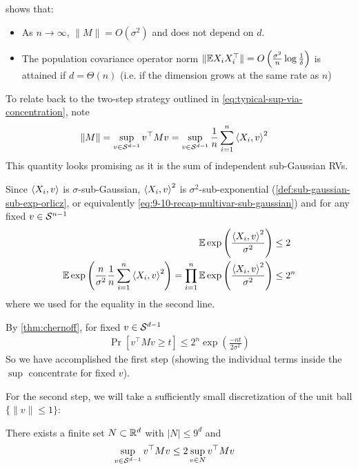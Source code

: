 \begin{remark}
     shows that:
    \begin{itemize}
        \item As $n \to \infty$, $\|M\| = O(\sigma^2)$ and does not depend on $d$.
        \item The population covariance operator norm $\|\mathbb{E} X_i X_i^\top\| = O\left( \frac{\sigma^2}{n} \log \frac{1}{\delta} \right)$ is attained if $d = \Theta(n)$ (i.e. if the dimension grows at the same rate as $n$)
    \end{itemize}
\end{remark}


To relate back to the two-step strategy outlined in \cref{eq:typical-sup-via-concentration}, note
\begin{align}
    \|M\| &= \sup_{v \in \mathcal{S}^{d-1}} v^\top M v
    = \sup_{v \in \mathcal{S}^{d-1}} \frac{1}{n} \sum_{i=1}^n \braket{X_i, v}^2
\end{align}
This quantity looks promising as it is the sum of independent sub-Gaussian RVs.

Since $\braket{X_i, v}$ is $\sigma$-sub-Gaussian, $\braket{X_i, v}^2$ is $\sigma^2$-sub-exponential (\cref{def:sub-gaussian-sub-exp-orlicz}, or equivalently \cref{eq:9-10-recap-multivar-sub-gaussian})
and for any fixed $v \in \mathcal{S}^{n-1}$ 
\begin{align}
    \mathbb{E} \exp\left(\frac{\braket{X_i, v}^2}{\sigma^2}\right) &\leq 2 \\
    \mathbb{E} \exp\left(\frac{n}{\sigma^2} \frac{1}{n} \sum_{i=1}^n \braket{X_i, v}^2 \right)
    = \prod_{i=1}^n \mathbb{E} \exp \left(\frac{\braket{X_i, v}^2}{\sigma^2}\right) 
    &\leq 2^n 
\end{align}
where we used  for the equality in the second line.

By \cref{thm:chernoff}, for fixed $v \in \mathcal{S}^{d-1}$
\begin{align}
    \Pr[v^\top M v \geq t] \leq 2^n \exp\left(\frac{-n t}{2 \sigma^2}\right) \label{eq:9-10-conc-sum}
\end{align}
So we have accomplished the first step (showing the individual terms inside the $\sup$ concentrate for fixed $v$).

For the second step, we will take a sufficiently small discretization of the unit ball $\{\|v\|\leq 1\}$:
\begin{lemma}\label{lem:9-10-unit-ball-packing}
    There exists a finite set $N \subset \mathbb{R}^d$ with $\lvert N \rvert \leq 9^d$ and 
    \begin{align}
        \sup_{v \in \mathcal{S}^{d-1}} v^\top M v &\leq 2 \sup_{v \in N} v^\top M v
    \end{align}
\end{lemma}

